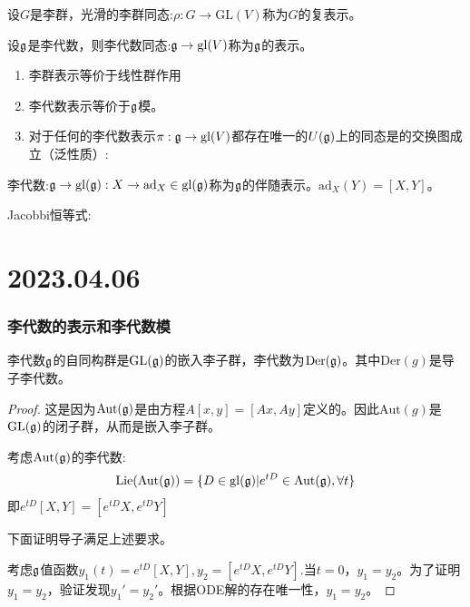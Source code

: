 \begin{definition}
    设$G$是李群，光滑的李群同态:$\rho:G \to \mathrm{GL}(V)$称为$G$的复表示。

    设$\mathfrak{g}$是李代数，则李代数同态:$\mathfrak{g} \to \mathrm{gl}(V)$称为$\mathfrak{g}$的表示。
\end{definition}
\begin{remark}
    \begin{enumerate}
        \item 李群表示等价于线性群作用
        \item 李代数表示等价于$\mathfrak{g}$模。
        \item 对于任何的李代数表示$\pi:\mathfrak{g} \to \mathrm{gl}(V)$都存在唯一的$U(\mathfrak{g})$上的同态是的交换图成立（泛性质）:
    \end{enumerate}
\end{remark}
\begin{definition}[伴随表示]
    李代数:$\mathfrak{g} \to \mathrm{gl}(\mathfrak{g}):X \to \mathrm{ad}_X \in \mathrm{gl}(\mathfrak{g})$称为$\mathfrak{g}$的伴随表示。$\mathrm{ad}_X(Y)=[X,Y]$。
\end{definition}
Jacobbi恒等式:

\chapter{2023.04.06}
\subsection{李代数的表示和李代数模}
\begin{proposition}
    李代数$\mathfrak{g}$的自同构群是$\mathrm{GL}(\mathfrak{g})$的嵌入李子群，李代数为$\mathrm{Der}(\mathfrak{g})$。其中$\mathrm{Der}(g)$是导子李代数。
\end{proposition}
\begin{proof}
    这是因为$\mathrm{Aut}(\mathfrak{g})$是由方程$A[x,y]=[Ax,Ay]$定义的。因此$\mathrm{Aut}(g)$是$\mathrm{GL}(\mathfrak{g})$的闭子群，从而是嵌入李子群。

    考虑$\mathrm{Aut}(\mathfrak{g})$的李代数:
    \begin{align}
        \mathrm{Lie}(\mathrm{Aut}(\mathfrak{g}))=\{D \in \mathrm{gl}(\mathfrak{g})|e^{tD}\in \mathrm{Aut}(\mathfrak{g}),\forall t\}
     \end{align}
    即$e^{tD}[X,Y]=[e^{tD}X,e^{tD}Y]$
    
    下面证明导子满足上述要求。

    考虑$\mathfrak{g}$值函数$y_1(t)=e^{tD}[X,Y],y_2=[e^{tD}X,e^{tD}Y]$.当$t=0$，$y_1=y_2$。为了证明$y_1=y_2$，验证发现$y_1'=y_2'$。根据ODE解的存在唯一性，$y_1=y_2$。
    \end{proof}
    
